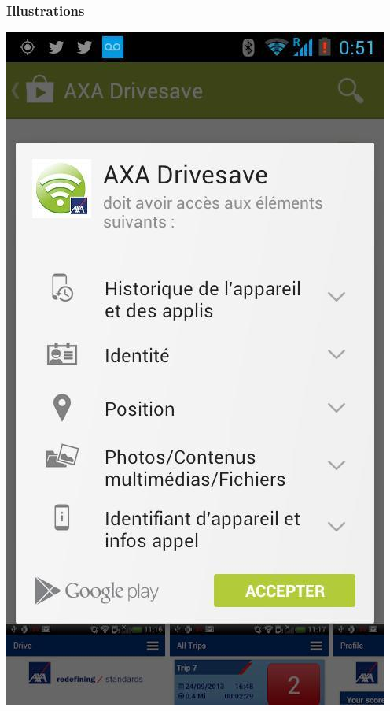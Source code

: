 \documentclass{beamer}
\begin{document}
\begin{frame}
\frametitle{Illustrations}
\begin{center}
\includegraphics[scale=0.3]{./images/AXA_assurance_gps.jpg} 
\end{center}
\end{frame}
\end{document}
